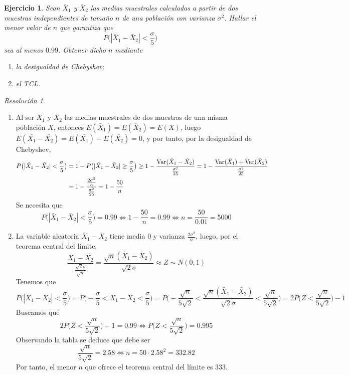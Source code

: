 \documentclass[11pt]{report}
\newtheorem{exercise}{Ejercicio}
\theoremstyle{remark}
\newtheorem*{resolution}{Resolución}
\begin{document}
\begin{exercise}
Sean $\bar{X}_1$ y $\bar{X}_2$ las medias muestrales calculadas a partir de dos muestras independientes de tamaño $n$ de una población con varianza $\sigma^2$. Hallar el menor valor de $n$ que garantiza que
\[P\bigl(|\bar{X}_1-\bar{X}_2|<\frac{\sigma}{5}\bigr)\]
sea al menos $0.99$. Obtener dicho $n$ mediante
\begin{enumerate}
    \item la desigualdad de Chebyshev;
    \item el TCL.
\end{enumerate}
\end{exercise}

\begin{resolution}
\hfill
\begin{enumerate}
    \item Al ser $\bar{X}_1$ y $\bar{X}_2$ las medias muestrales de dos muestras de una misma población $X$, entonces $E(\bar{X}_1) = E(\bar{X}_2) = E(X)$, luego $E(\bar{X_1}-\bar{X_2}) = E(\bar{X_1})-E(\bar{X_2}) = 0$, y por tanto, por la desigualdad de Chebyshev,
    \[\begin{aligned}[t]
    P\bigl(|\bar{X}_1-\bar{X}_2|<\frac{\sigma}{5}\bigr) &= 1-P\bigl(|\bar{X}_1-\bar{X}_2|\geq\frac{\sigma}{5}\bigr) \geq 1-\frac{\textup{Var}(\bar{X}_1-\bar{X}_2)}{\frac{\sigma^2}{25}} = 1-\frac{\textup{Var}(\bar{X}_1)+\textup{Var}(\bar{X}_2)}{\frac{\sigma^2}{25}} \\
    &= 1-\frac{\frac{2\sigma^2}{n}}{\frac{\sigma^2}{25}} = 1-\frac{50}{n}
    \end{aligned}
    \]
    Se necesita que
    \[P\bigl(|\bar{X}_1-\bar{X}_2|<\frac{\sigma}{5}\bigr) = 0.99 \iff 1-\frac{50}{n} = 0.99 \iff n = \frac{50}{0.01} = 5000\]
    \item La variable aleatoria $\bar{X}_1-\bar{X}_2$ tiene media $0$ y varianza $\frac{2\sigma^2}{n}$, luego, por el teorema central del límite,
    \[\frac{\bar{X}_1-\bar{X}_2}{\frac{\sqrt{2}\sigma}{\sqrt{n}}} = \frac{\sqrt{n}(\bar{X}_1-\bar{X}_2)}{\sqrt{2}\sigma} \approx Z \sim N(0,1)\] Tenemos que
    \[P\bigl(|\bar{X}_1-\bar{X}_2|<\frac{\sigma}{5}\bigr) = P\bigl(-\frac{\sigma}{5} < \bar{X}_1-\bar{X}_2<\frac{\sigma}{5}\bigr) = P\bigl(-\frac{\sqrt{n}}{5\sqrt{2}} < \frac{\sqrt{n}(\bar{X}_1-\bar{X}_2)}{\sqrt{2}\sigma} < \frac{\sqrt{n}}{5\sqrt{2}}\bigr) = 2P\bigl(Z < \frac{\sqrt{n}}{5\sqrt{2}}\bigr)-1\]
    Buscamos que
    \[2P\bigl(Z < \frac{\sqrt{n}}{5\sqrt{2}}\bigr)-1 = 0.99 \iff P\bigl(Z < \frac{\sqrt{n}}{5\sqrt{2}}\bigr) = 0.995\]
    Observando la tabla se deduce que debe ser
    \[\frac{\sqrt{n}}{5\sqrt{2}} = 2.58 \iff n = 50 \cdot 2.58^2 = 332.82\]
    Por tanto, el menor $n$ que ofrece el teorema central del límite es $333$.
\end{enumerate}
\end{resolution}
\end{document}
